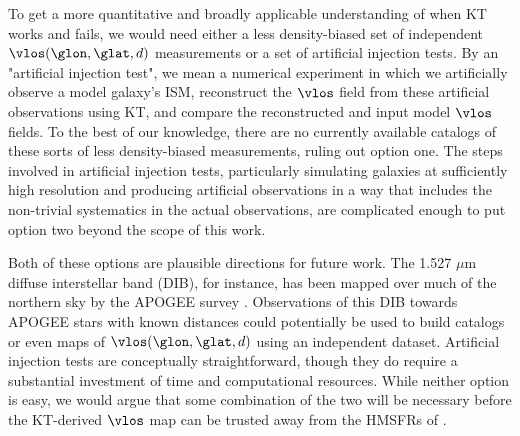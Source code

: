To get a more quantitative and broadly applicable understanding of when KT works and fails, we would need either a less density-biased set of independent $\vlos(\glon, \glat, d)$ measurements or a set of artificial injection tests. 
By an "artificial injection test", we mean a numerical experiment in which we artificially observe a model galaxy's ISM, reconstruct the $\vlos$ field from these artificial observations using KT, and compare the reconstructed and input model $\vlos$ fields. 
To the best of our knowledge, there are no currently available catalogs of these sorts of less density-biased measurements, ruling out option one.
The steps involved in artificial injection tests, particularly simulating galaxies at sufficiently high resolution and producing artificial observations in a way that includes the non-trivial systematics in the actual observations, are complicated enough to put option two beyond the scope of this work.

Both of these options are plausible directions for future work. 
The 1.527 $\mu$m diffuse interstellar band (DIB), for instance, has been mapped over much of the northern sky by the APOGEE survey \citep{2015ApJ...798...35Z}. 
Observations of this DIB towards APOGEE stars with known distances could potentially be used to build catalogs or even maps of $\vlos(\glon, \glat, d)$ using an independent dataset. 
Artificial injection tests are conceptually straightforward, though they do require a substantial investment of time and computational resources.
While neither option is easy, we would argue that some combination of the two will be necessary before the KT-derived $\vlos$ map can be trusted away from the HMSFRs of \Reid{}.
